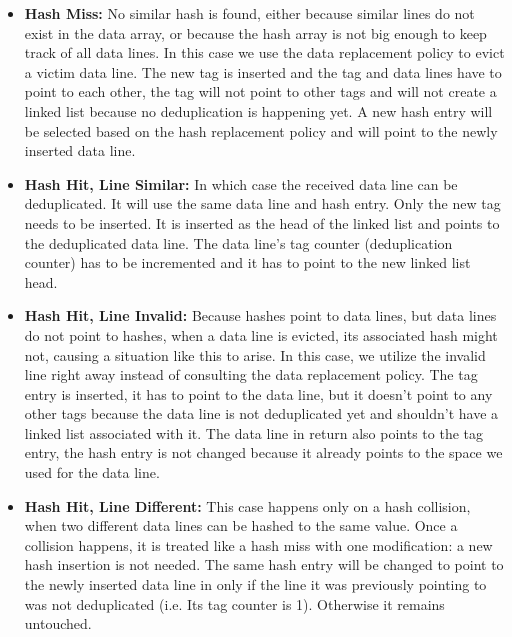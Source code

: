 \begin{itemize}
    \item \textbf{Hash Miss:} No similar hash is found, either because similar lines do not exist in the data array, or because the hash array is not big enough to keep track of all data lines. In this case we use the data replacement policy to evict a victim data line. The new tag is inserted and the tag and data lines have to point to each other, the tag will not point to other tags and will not create a linked list because no deduplication is happening yet. A new hash entry will be selected based on the hash replacement policy and will point to the newly inserted data line.
    \item \textbf{Hash Hit, Line Similar:} In which case the received data line can be deduplicated. It will use the same data line and hash entry. Only the new tag needs to be inserted. It is inserted as the head of the linked list and points to the deduplicated data line. The data line's tag counter (deduplication counter) has to be incremented and it has to point to the new linked list head.
    \item \textbf{Hash Hit, Line Invalid:} Because hashes point to data lines, but data lines do not point to hashes, when a data line is evicted, its associated hash might not, causing a situation like this to arise. In this case, we utilize the invalid line right away instead of consulting the data replacement policy. The tag entry is inserted, it has to point to the data line, but it doesn't point to any other tags because the data line is not deduplicated yet and shouldn't have a linked list associated with it. The data line in return also points to the tag entry, the hash entry is not changed because it already points to the space we used for the data line.
    \item \textbf{Hash Hit, Line Different:} This case happens only on a hash collision, when two different data lines can be hashed to the same value. Once a collision happens, it is treated like a hash miss with one modification: a new hash insertion is not needed. The same hash entry will be changed to point to the newly inserted data line in only if the line it was previously pointing to was not deduplicated (i.e. Its tag counter is 1). Otherwise it remains untouched.
\end{itemize}

